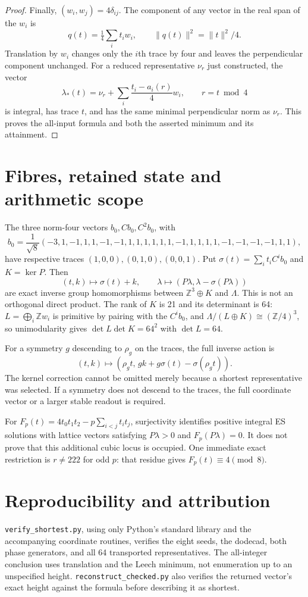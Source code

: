 \documentclass[10pt,reqno]{amsart}
\theoremstyle{remark}\newtheorem{remark}[theorem]{Remark}
\newcommand{\Z}{\mathbb Z}\newcommand{\Q}{\mathbb Q}\newcommand{\R}{\mathbb R}\newcommand{\F}{\mathbb F}
\newcommand{\La}{\Lambda}\newcommand{\tr}{\operatorname{tr}}
\begin{document}
\begin{proof}
Finally, $(w_i,w_j)=4\delta_{ij}$. The component of any vector in the real span of the $w_i$ is
\[
q(t)=\tfrac14\sum_i t_iw_i,\qquad\|q(t)\|^2=\|t\|^2/4.
\]
Translation by $w_i$ changes only the $i$th trace by four and leaves the perpendicular component unchanged. For a reduced representative $\nu_r$ just constructed, the vector
\[
\boxed{\lambda_*(t)=\nu_r+\sum_i\frac{t_i-a_i(r)}4w_i,\qquad r=t\bmod4}
\]
is integral, has trace $t$, and has the same minimal perpendicular norm as $\nu_r$. This proves the all-input formula and both the asserted minimum and its attainment.
\end{proof}

\section{Fibres, retained state and arithmetic scope}
The three norm-four vectors $b_0,Cb_0,C^2b_0$, with
\[
b_0=\frac1{\sqrt8}(-3,1,-1,1,1,-1,-1,1,1,1,1,1,1,-1,1,1,1,1,-1,-1,-1,-1,1,1),
\]
have respective traces $(1,0,0),(0,1,0),(0,0,1)$. Put $\sigma(t)=\sum_i t_iC^ib_0$ and $K=\ker P$. Then
\[
(t,k)\longmapsto\sigma(t)+k,\qquad
\lambda\longmapsto(P\lambda,\lambda-\sigma(P\lambda))
\]
are exact inverse group homomorphisms between $\Z^3\oplus K$ and $\La$. This is not an orthogonal direct product. The rank of $K$ is 21 and its determinant is 64: $L=\bigoplus_i\Z w_i$ is primitive by pairing with the $C^ib_0$, and $\La/(L\oplus K)\cong(\Z/4)^3$, so unimodularity gives $\det L\det K=64^2$ with $\det L=64$.

For a symmetry $g$ descending to $\rho_g$ on the traces, the full inverse action is
\[
(t,k)\longmapsto(\rho_gt,\,gk+g\sigma(t)-\sigma(\rho_gt)).
\]
The kernel correction cannot be omitted merely because a shortest representative was selected. If a symmetry does not descend to the traces, the full coordinate vector or a larger stable readout is required.

For $F_p(t)=4t_0t_1t_2-p\sum_{i<j}t_it_j$, surjectivity identifies positive integral ES solutions with lattice vectors satisfying $P\lambda>0$ and $F_p(P\lambda)=0$. It does not prove that this additional cubic locus is occupied. One immediate exact restriction is $r\ne222$ for odd $p$: that residue gives $F_p(t)\equiv4\pmod8$.

\section{Reproducibility and attribution}
\texttt{verify\_shortest.py}, using only Python's standard library and the accompanying coordinate routines, verifies the eight seeds, the dodecad, both phase generators, and all 64 transported representatives. The all-integer conclusion uses translation and the Leech minimum, not enumeration up to an unspecified height. \texttt{reconstruct\_checked.py} also verifies the returned vector's exact height against the formula before describing it as shortest.
\end{document}
